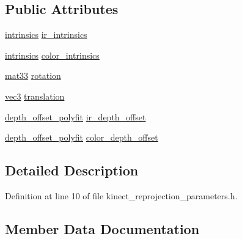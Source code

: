 \subsection*{Public Attributes}
\begin{DoxyCompactItemize}
\item 
\hyperlink{structtlz_1_1intrinsics}{intrinsics} \hyperlink{structtlz_1_1kinect__reprojection__parameters_a6b3acf29e3ad48ce93abefd55f27a094}{ir\+\_\+intrinsics}
\item 
\hyperlink{structtlz_1_1intrinsics}{intrinsics} \hyperlink{structtlz_1_1kinect__reprojection__parameters_a606d0519bab1b1dec71c3845aa5437f6}{color\+\_\+intrinsics}
\item 
\hyperlink{namespacetlz_a6679497d5121f319147594e1f344ef57}{mat33} \hyperlink{structtlz_1_1kinect__reprojection__parameters_ac7fdf95ebee703b30fc12bed872d4359}{rotation}
\item 
\hyperlink{namespacetlz_ad0646d752ddb9d40d702d40cc6dc54a1}{vec3} \hyperlink{structtlz_1_1kinect__reprojection__parameters_a047b6fa80fb7abd56ea6f67b8a3646b0}{translation}
\item 
\hyperlink{structtlz_1_1kinect__reprojection__parameters_1_1depth__offset__polyfit}{depth\+\_\+offset\+\_\+polyfit} \hyperlink{structtlz_1_1kinect__reprojection__parameters_ad803626223373e033c08ca0c87ca3f3d}{ir\+\_\+depth\+\_\+offset}
\item 
\hyperlink{structtlz_1_1kinect__reprojection__parameters_1_1depth__offset__polyfit}{depth\+\_\+offset\+\_\+polyfit} \hyperlink{structtlz_1_1kinect__reprojection__parameters_a9c841a8a22e389589254c6b0bcac5e7f}{color\+\_\+depth\+\_\+offset}
\end{DoxyCompactItemize}


\subsection{Detailed Description}


Definition at line 10 of file kinect\+\_\+reprojection\+\_\+parameters.\+h.



\subsection{Member Data Documentation}
